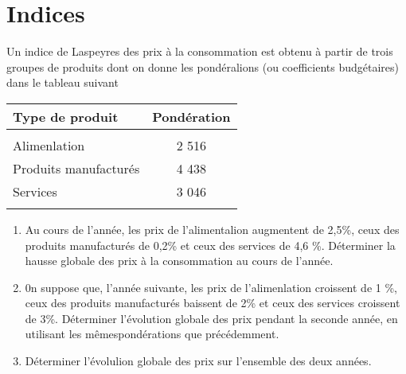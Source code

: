 \documentclass[a4paper,11pt]{article}
\begin{document}
\section{Indices}


Un indice de Laspeyres des prix à la consommation est obtenu à partir de trois groupes de produits dont on donne les pondéralions (ou coefficients budgétaires) dans le tableau suivant
\begin{center}
\begin{tabular}{|l|c|}
\hline
Type de produit & Pondération \\
\hline
  &  \\
Alimenlation  & 2 516 \\
Produits manufacturés & 4 438 \\
Services & 3 046 \\
  &  \\
\hline
 
\end{tabular}
\end{center}
\begin{enumerate}
\item Au cours de l'année, les prix de l'alimentalion augmentent de 2,5\%, ceux des produits manufacturés de 0,2\% et ceux des services de 4,6 \%. Déterminer la hausse globale des prix à la consommation au cours de l'année.
\item 0n suppose que, l'année suivante, les prix de l'alimenlation croissent de 1 \%, ceux des produits manufacturés baissent
de 2\% et ceux des services croissent de 3\%. Déterminer l'évolution globale des prix pendant la seconde année, en utilisant les mêmespondérations que précédemment.
\item Déterminer l'évolulion globale des prix sur l'ensemble des deux années. 
\end{enumerate}
\vspace{0.4cm}

\end{document}
